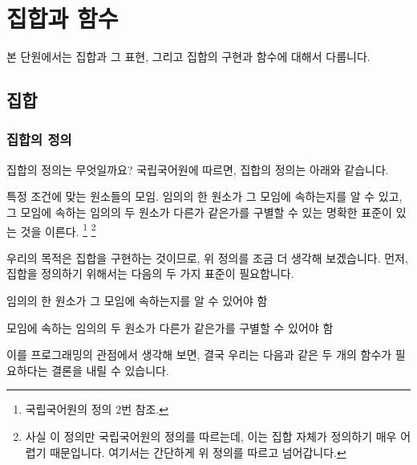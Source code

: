 \chapter{집합과 함수}

본 단원에서는 집합과 그 표현, 그리고 집합의 구현과 함수에 대해서 다룹니다. 

\section{집합} 

\subsection{집합의 정의}

집합의 정의는 무엇일까요? 국립국어원에 따르면, 집합의 정의는 아래와 같습니다. 

\begin{define}[집합]
특정 조건에 맞는 원소들의 모임. 임의의 한 원소가 그 모임에 속하는지를 알 수 있고, 그 모임에 속하는 임의의 두 원소가 다른가 같은가를 구별할 수 있는 명확한 표준이 있는 것을 이른다. \footnote{국립국어원의 정의 2번 참조.} \footnote{사실 이 정의만 국립국어원의 정의를 따르는데, 이는 집합 자체가 정의하기 매우 어렵기 때문입니다. 여기서는 간단하게 위 정의를 따르고 넘어갑니다.} 
\end{define}

우리의 목적은 집합을 구현하는 것이므로, 위 정의를 조금 더 생각해 보겠습니다. 먼저, 집합을 정의하기 위해서는 다음의 두 가지 표준이 필요합니다. 

\begin{compactitem} 
\item 임의의 한 원소가 그 모임에 속하는지를 알 수 있어야 함
\item 모임에 속하는 임의의 두 원소가 다른가 같은가를 구별할 수 있어야 함
\end{compactitem}

이를 프로그래밍의 관점에서 생각해 보면, 결국 우리는 다음과 같은 두 개의 함수가 필요하다는 결론을 내릴 수 있습니다. 


